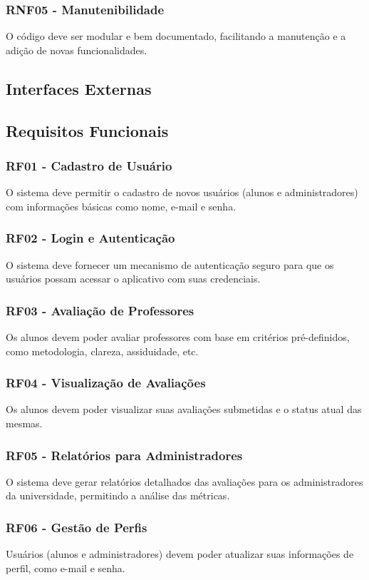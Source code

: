 \documentclass[12pt]{article}
\begin{document}
      \subsubsection{RNF05 - Manutenibilidade}
          O código deve ser modular e bem documentado, facilitando a manutenção e a adição de novas funcionalidades.
  \subsection{ Interfaces Externas}
  \subsection{Requisitos Funcionais}
      \subsubsection{RF01 - Cadastro de Usuário}
          O sistema deve permitir o cadastro de novos usuários (alunos e administradores) com informações básicas como nome, e-mail e senha.
      \subsubsection{RF02 - Login e Autenticação}
          O sistema deve fornecer um mecanismo de autenticação seguro para que os usuários possam acessar o aplicativo com suas credenciais.
      \subsubsection{RF03 - Avaliação de Professores}
          Os alunos devem poder avaliar professores com base em critérios pré-definidos, como metodologia, clareza, assiduidade, etc.
      \subsubsection{RF04 - Visualização de Avaliações}
           Os alunos devem poder visualizar suas avaliações submetidas e o status atual das mesmas.
      \subsubsection{RF05 - Relatórios para Administradores}
          O sistema deve gerar relatórios detalhados das avaliações para os administradores da universidade, permitindo a análise das métricas.
      \subsubsection{RF06 - Gestão de Perfis}
          Usuários (alunos e administradores) devem poder atualizar suas informações de perfil, como e-mail e senha.
\end{document}
